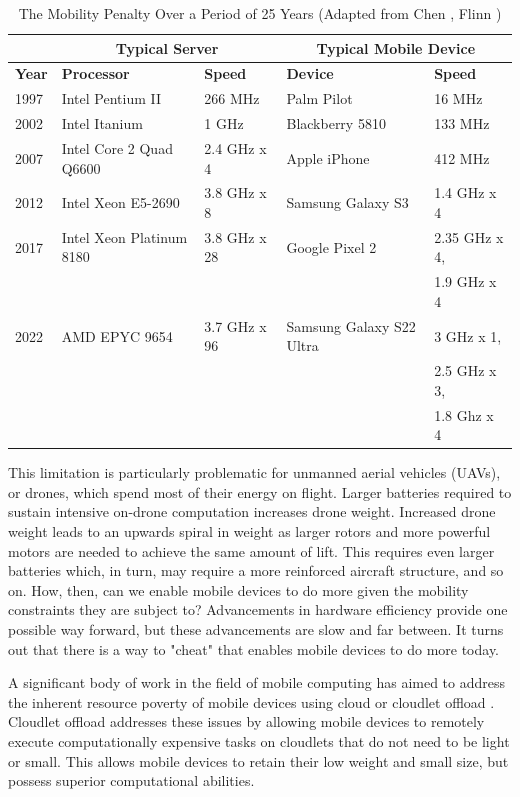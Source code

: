 \begin{table}[htbp]
    \centering
    \begin{tabular}{@{}lllll}
        \toprule & \multicolumn{2}{c}{\textbf{Typical Server}} & \multicolumn{2}{c}{\textbf{Typical Mobile Device}}\\\midrule
        \textbf{Year} & \textbf{Processor} & \textbf{Speed} & \textbf{Device} & \textbf{Speed}\\\midrule
        1997 & Intel Pentium II & 266 MHz & Palm Pilot & 16 MHz\\
        2002 & Intel Itanium & 1 GHz & Blackberry 5810 & 133 MHz\\
        2007 & Intel Core 2 Quad Q6600 & 2.4 GHz x 4 & Apple iPhone & 412 MHz\\
        2012 & Intel Xeon E5-2690 & 3.8 GHz x 8 & Samsung Galaxy S3 & 1.4 GHz x 4\\
        2017 & Intel Xeon Platinum 8180 & 3.8 GHz x 28 & Google Pixel 2 & 2.35 GHz x 4,\\
             &&&& 1.9 GHz x 4\\
        2022 & AMD EPYC 9654 & 3.7 GHz x 96 & Samsung Galaxy S22 Ultra & 3 GHz x 1,\\
             &&&& 2.5 GHz x 3,\\
             &&&& 1.8 Ghz x 4\\
        \bottomrule
    \end{tabular}
    \caption{The Mobility Penalty Over a Period of 25 Years (Adapted from Chen \cite{zchenthesis}, Flinn \cite{flinn2012cyber})}
    \label{tab:mobility-constraints}
\end{table}

This limitation is particularly problematic for unmanned aerial vehicles
(UAVs), or drones, which spend most of their energy on flight. Larger batteries
required to sustain intensive on-drone computation increases drone weight.
Increased drone weight leads to an upwards spiral in weight as larger rotors
and more powerful motors are needed to achieve the same amount of lift.  This
requires even larger batteries which, in turn, may require a more reinforced
aircraft structure, and so on. How, then, can we enable mobile devices to do
more given the mobility constraints they are subject to? Advancements in
hardware efficiency provide one possible way forward, but these advancements
are slow and far between. It turns out that there is a way to "cheat" that
enables mobile devices to do more today.

A significant body of work in the field of mobile computing has aimed to
address the inherent resource poverty of mobile devices using cloud or cloudlet
offload \cite{satya1996,satya2009}.  Cloudlet offload addresses these issues by
allowing mobile devices to remotely execute computationally expensive tasks on
cloudlets that do not need to be light or small. This allows mobile devices to
retain their low weight and small size, but possess superior computational
abilities.

